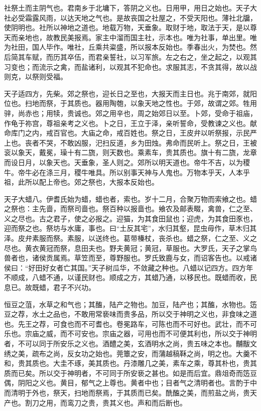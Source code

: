 \documentclass[]{article}
\begin{document}
社祭土而主阴气也。君南乡于北墉下，答阴之义也。日用甲，用日之始也。天子大社必受霜露风雨，以达天地之气也。是故丧国之社屋之，不受天阳也。薄社北牖，使阴明也。社所以神地之道也。地载万物，天垂象。取财于地，取法于天，是以尊天而亲地也，故教民美报焉。家主中溜而国主社，示本也。唯为社事，单出里。唯为社田，国人毕作。唯社，丘乘共粢盛，所以报本反始也。季春出火，为焚也。然后简其车赋，而历其卒伍，而君亲誓社，以习军旅。左之右之，坐之起之，以观其习变也；而流示之禽，而盐诸利，以观其不犯命也。求服其志，不贪其得，故以战则克，以祭则受福。

天子适四方，先柴。郊之祭也，迎长日之至也，大报天而主日也。兆于南郊，就阳位也。扫地而祭，于其质也。器用陶匏，以象天地之性也。于郊，故谓之郊。牲用骍，尚赤也；用犊，贵诚也。郊之用辛也，周之始郊日以至。卜郊，受命于祖庙，作龟于祢宫，尊祖亲考之义也。卜之日，王立于泽，亲听誓命，受教谏之义也。献命库门之内，戒百官也。大庙之命，戒百姓也。祭之日，王皮弁以听祭报，示民严上也。丧者不哭，不敢凶服，汜扫反道，乡为田烛。弗命而民听上。祭之日，王被衮以象天，戴冕，璪十有二旒，则天数也。乘素车，贵其质也。旗十有二旒，龙章而设日月，以象天也。天垂象，圣人则之。郊所以明天道也。帝牛不吉，以为稷牛。帝牛必在涤三月，稷牛唯具。所以别事天神与人鬼也。万物本乎天，人本乎祖，此所以配上帝也。郊之祭也，大报本反始也。

天子大蜡八。伊耆氏始为蜡，蜡也者，索也。岁十二月，合聚万物而索飨之也。蜡之祭也：主先啬，而祭司啬也。祭百种以报啬也。飨农及邮表畷，禽兽，仁之至、义之尽也。古之君子，使之必报之。迎猫，为其食田鼠也；迎虎，为其食田豕也，迎而祭之也。祭坊与水庸，事也。曰``土反其宅''，水归其壑，昆虫毋作，草木归其泽。皮弁素服而祭。素服，以送终也。葛带榛杖，丧杀也。蜡之祭，仁之至、义之尽也。黄衣黄冠而祭，息田夫也。野夫黄冠；黄冠，草服也。大罗氏，天子之掌鸟兽者也，诸侯贡属焉。草笠而至，尊野服也。罗氏致鹿与女，而诏客告也。以戒诸侯曰：``好田好女者亡其国。''天子树瓜华，不敛藏之种也。八蜡以记四方。四方年不顺成，八蜡不通，以谨民财也。顺成之方，其蜡乃通，以移民也。既蜡而收，民息已。故既蜡，君子不兴功。

恒豆之菹，水草之和气也；其醢，陆产之物也。加豆，陆产也；其醢，水物也。笾豆之荐，水土之品也，不敢用常亵味而贵多品，所以交于神明之义也，非食味之道也。先王之荐，可食也而不可耆也。卷冕路车，可陈也而不可好也。武壮，而不可乐也。宗庙之威，而不可安也。宗庙之器，可用也而不可便其利也，所以交于神明者，不可以同于所安乐之义也。酒醴之美，玄酒明水之尚，贵五味之本也。黼黻文绣之美，疏布之尚，反女功之始也。莞簟之安，而蒲越稿鞂之尚，明之也。大羹不和，贵其质也。大圭不琢，美其质也。丹漆雕几之美，素车之乘，尊其朴也，贵其质而已矣。所以交于神明者，不可同于所安亵之甚也。如是而后宜。鼎俎奇而笾豆偶，阴阳之义也。黄目，郁气之上尊也。黄者中也；目者气之清明者也。言酌于中而清明于外也，祭天，扫地而祭焉，于其质而已矣。酰醢之美，而煎盐之尚，贵天产也。割刀之用，而鸾刀之贵，贵其义也。声和而后断也。
\end{document}
